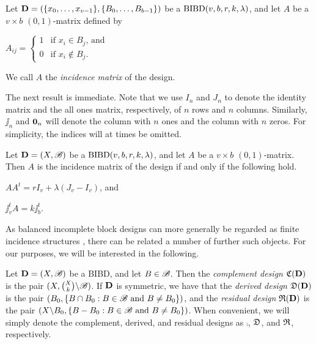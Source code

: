 \documentclass[../../../main]{subfiles}
\begin{document}
\begin{defin}\label{incidence}
 Let $\mathbf{D}=(\{x_0, \dots, x_{v-1}\},\{B_0, \dots, B_{b-1}\})$ be a $\text{BIBD}(v,b,r,k,\lambda)$, and let $A$ be a $v \times b$ $(0,1)$-matrix defined by
 \begin{defenum}
 \item $A_{ij} = 
 \begin{cases}
  1 & \text{if } x_i \in B_j \text{, and} \\
  0 & \text{if } x_i \not\in B_j.
 \end{cases}$
 \end{defenum}
 We call $A$ the {\it incidence matrix} of the design.
\end{defin}

The next result is immediate. Note that we use $I_n$ and $J_n$ to denote the identity matrix and the all ones matrix, respectively, of $n$ rows and $n$ columns. Similarly, $\jj_n$ and $\mathbf{0}_n$ will denote the column with $n$ ones and the column with $n$ zeros. For simplicity, the indices will at times be omitted.

\begin{prop}\label{incidence prop}
 Let $\mathbf{D}=(X,\mathscr{B})$ be a $\text{BIBD}(v,b,r,k,\lambda)$, and let $A$ be a $v \times b$ $(0,1)$-matrix. Then $A$ is the incidence matrix of the design if and only if the following hold.
 \begin{defenum}
 \item\label{inc1} $AA^t = rI_v + \lambda(J_v - I_v)$, and
  \item\label{inc2} $\jj_v^tA = k\jj_b^t$.
 \end{defenum}
\end{prop}

As balanced incomplete block designs can more generally be regarded as finite
incidence structures , there can be related a number of further such objects. For our purposes, we will be interested in the following. 

\begin{defin}\label{res-der}
 Let $\mathbf{D}=(X,\mathscr{B})$ be a BIBD, and let $B \in \mathscr{B}$. Then the {\it complement design} $\mathfrak{C}(\mathbf{D})$ is the pair $(X,\binom{X}{k} \backslash \mathscr{B})$. If $\mathbf{D}$ is symmetric, we have that the {\it derived design} $\mathfrak{D}(\mathbf{D})$ is the pair $(B_0, \{B \cap B_0 : B \in \mathscr{B} \text{ and } B \neq B_0\})$, and the {\it residual design} $\mathfrak{R}(\mathbf{D})$ is the pair $(X \backslash B_0, \{B - B_0 : B \in \mathscr{B} \text{ and } B \neq B_0\})$. When convenient, we will simply denote the complement, derived, and residual designs as $\comp$, $\mathfrak{D}$, and $\mathfrak{R}$, respectively.
\end{defin}
\end{document}
